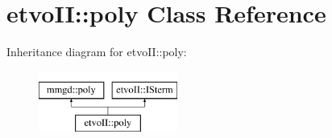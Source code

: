 \hypertarget{classetvo_i_i_1_1poly}{}\section{etvo\+II\+:\+:poly Class Reference}
\label{classetvo_i_i_1_1poly}
Inheritance diagram for etvo\+II\+:\+:poly\+:\begin{figure}[H]
\begin{center}
\leavevmode
\includegraphics[height=2.000000cm]{classetvo_i_i_1_1poly}
\end{center}
\end{figure}
